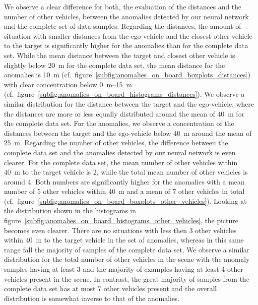 We observe a clear difference for both, the evaluation of the distances and the number of other vehicles, between the anomalies detected by our neural network and the complete set of data samples.
Regarding the distances, the amount of situation with smaller distances from the ego-vehicle and the closest other vehicle to the target is significantly higher for the anomalies than for the complete data set.
While the mean distance between the target and closest other vehicle is slightly below \SI{20}{\meter} for the complete data set, the mean distance for the anomalies is \SI{10}{\meter} (cf.\ figure~\ref{subfig:anomalies_on_board_boxplots_distances}) with clear concentration below \SIrange{0}{15}{\meter} (cf.\ figure~\ref{subfig:anomalies_on_board_histograms_distances}).
We observe a similar distribution for the distance between the target and the ego-vehicle, where the distances are more or less equally distributed around the mean of \SI{40}{\meter} for the complete data set.
For the anomalies, we observe a concentration of the distances between the target and the ego-vehicle below \SI{40}{\meter} around the mean of \SI{25}{\meter}.
Regarding the number of other vehicles, the difference between the complete data set and the anomalies detected by our neural network is even clearer.
For the complete data set, the mean number of other vehicles within \SI{40}{\meter} to the target vehicle is \num{2}, while the total mean number of other vehicles is around \num{4}.
Both numbers are significantly higher for the anomalies with a mean number of \num{5} other vehicles within \SI{40}{\meter} and a mean of \num{7} other vehicles in total (cf.\ figure~\ref{subfig:anomalies_on_board_boxplots_other_vehicles}).
Looking at the distribution shown in the histograms in figure~\ref{subfig:anomalies_on_board_histograms_other_vehicles}, the picture becomes even clearer. 
There are no situations with less then \num{3} other vehicles within \SI{40}{\meter} to the target vehicle in the set of anomalies, whereas in this same range fall the majority of samples of the complete data set.
We observe a similar distribution for the total number of other vehicles in the scene with the anomaly samples having at least \num{3} and the majority of examples having at least \num{4} other vehicles present in the scene.
In contrast, the great majority of samples from the complete data set has at most \num{7} other vehicles present and the overall distribution is somewhat inverse to that of the anomalies.
